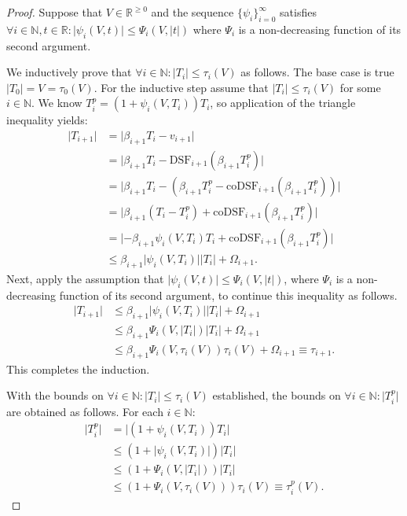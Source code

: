 \documentclass[10pt]{article}
\theoremstyle{definition}
\theoremstyle{remark}
\numberwithin{equation}{section}
\newcommand{\dsf}{\text{DSF}}
\newcommand{\codsf}{\text{coDSF}}
\newcommand{\nats}{\mathbb{N}}
\newcommand{\reals}{\mathbb{R}}
\newcommand{\nnreals}{\mathbb{R}^{\ge0}}
\newcommand{\abs}[1]{\lvert #1 \rvert}
\begin{document}
\begin{proof}
	Suppose that $V \in \nnreals$ and the sequence $\{\psi_i\}_{i=0}^\infty$ satisfies $\forall i\in\nats, t \in \reals: \abs{\psi_i(V,t)} \le \Psi_i(V,\abs{t})$ where $\Psi_i$ is a non-decreasing function of its second argument.
	
	We inductively prove that $\forall i \in \nats: \abs{T_i} \le \tau_i(V)$ as follows. 
	The base case is true $\abs{T_0} = V = \tau_0(V)$.
	For the inductive step assume that $\abs{T_i} \le \tau_i(V)$ for some $i \in \nats$. 
	We know $T^p_i = (1+\psi_i(V,T_i)) T_i$, so application of the triangle inequality yields:
	\begin{align*}
	\abs{T_{i+1}} 
	&= \abs{\beta_{i+1} T_i - v_{i+1}} \\
	&= \abs{\beta_{i+1} T_i - \dsf_{i+1}(\beta_{i+1} T^p_i)} \\
	&= \abs{\beta_{i+1} T_i - (\beta_{i+1} T^p_i - \codsf_{i+1}(\beta_{i+1} T^p_i))} \\
	&= \abs{\beta_{i+1} (T_i - T^p_i) + \codsf_{i+1}(\beta_{i+1} T^p_i)} \\
	&=\abs{-\beta_{i+1} \psi_i(V,T_i) T_i + \codsf_{i+1}(\beta_{i+1} T^p_i)} \\
	&\le \beta_{i+1} \abs{\psi_i(V,T_i)} \abs{T_i} + \Omega_{i+1} .
	\end{align*}
	Next, apply the assumption that $\abs{\psi_i(V,t)} \le \Psi_i(V,\abs{t})$, where $\Psi_i$ is a non-decreasing function of its second argument, to continue this inequality as follows.
	\begin{align*}
	\abs{T_{i+1}} 
	&\le \beta_{i+1} \abs{\psi_i(V,T_i)} \abs{T_i} + \Omega_{i+1} \\
	&\le \beta_{i+1} \Psi_i(V,\abs{T_i}) \abs{T_i} + \Omega_{i+1} \\
	&\le \beta_{i+1} \Psi_i(V,\tau_i(V)) \tau_i(V) + \Omega_{i+1} \equiv \tau_{i+1} .
	\end{align*}
This completes the induction.

With the bounds on $\forall i \in \nats: \abs{T_i} \le \tau_i(V)$ established, the bounds on $\forall i \in \nats: \abs{T^p_i}$ are obtained as follows. For each $i \in \nats$:
	\begin{align*}
	\abs{T^p_i} &= \abs{(1+\psi_i(V,T_i)) T_i} \\
	            &\le (1+\abs{\psi_i(V,T_i)}) \abs{T_i} \\
                &\le (1+\Psi_i(V,\abs{T_i})) \abs{T_i} \\
	            &\le (1+\Psi_i(V,\tau_i(V))) \tau_i(V) \equiv \tau_i^p(V) .
	\end{align*}
\end{proof}
\end{document}
